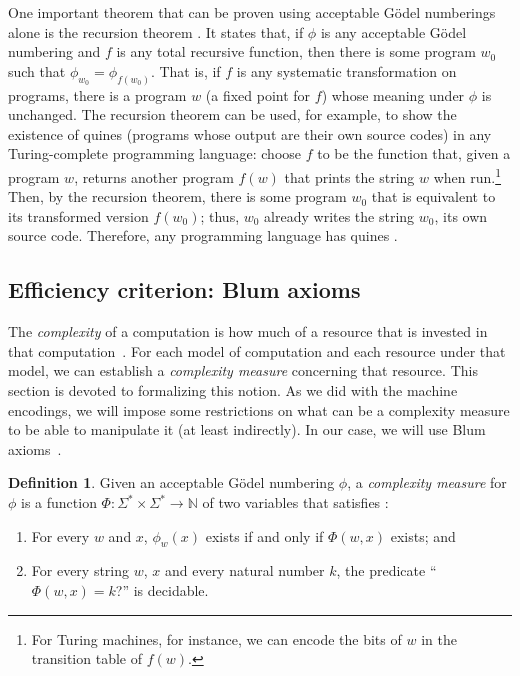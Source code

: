 \documentclass[12pt]{article}
\theoremstyle{definition}
\newtheorem{definition}{Definition}
\begin{document}
One important theorem that can be proven using acceptable Gödel numberings alone
is the recursion theorem
\cite[p.~181]{Rogers1987}.
It states that, if $\phi$ is any acceptable Gödel numbering
and $f$ is any total recursive function,
then there is some program $w_0$ such that $\phi_{w_0} = \phi_{f(w_0)}$.
That is,
if $f$ is any systematic transformation on programs,
there is a program $w$ (a fixed point for $f$) whose meaning under $\phi$ is unchanged.
The recursion theorem can be used,
for example, to show the existence of quines
(programs whose output are their own source codes)
in any Turing-complete programming language:
choose $f$ to be the function that, given a program $w$,
returns another program $f(w)$ that prints the string $w$ when run.\footnote{
    For Turing machines, for instance,
    we can encode the bits of $w$ in the transition table of $f(w)$.
}
Then, by the recursion theorem,
there is some program $w_0$ that is equivalent to its transformed version $f(w_0)$;
thus, $w_0$ already writes the string $w_0$, its own source code.
Therefore, any programming language has quines \cite[p.~227]{Kozen2006}.

\subsection{Efficiency criterion: Blum axioms}
\label{sec:blum-axioms}

The \emph{complexity} of a computation is how much of a resource
that is invested in that computation~\cite[p.~285]{HopcroftUllman1979}.
For each model of computation and each resource under that model,
we can establish a \emph{complexity measure} concerning that resource.
This section is devoted to formalizing this notion.
As we did with the machine encodings,
we will impose some restrictions on what can be a complexity measure
to be able to manipulate it (at least indirectly).
In our case,
we will use Blum axioms~\cite[p.~324]{Blum1967}.

\vspace{12pt}
\begin{definition}
    Given an acceptable Gödel numbering $\phi$,
    a \emph{complexity measure} for $\phi$
    is a function $\Phi:\Sigma^* \times \Sigma^* \to \mathbb N$ of two variables
    that satisfies \cite[p.~324]{Blum1967}:
    \begin{enumerate}
        \item For every $w$ and $x$,
            $\phi_w(x)$ exists if and only if $\Phi(w, x)$ exists; and
        \item For every string $w$, $x$ and every natural number $k$,
            the predicate ``$\Phi(w, x) = k$?'' is decidable.
    \end{enumerate}
\end{definition}
\end{document}
